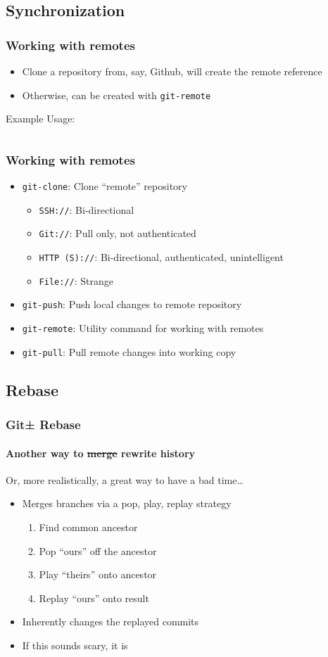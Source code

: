 \documentclass[]{beamer}
\begin{document}
\subsection{Synchronization}
\begin{frame}[fragile]
\frametitle{Working with remotes}
\begin{itemize}
\item{Clone a repository from, say, Github, will create the remote reference}
\item{Otherwise, can be created with \texttt{git-remote}}
\end{itemize}
Example Usage:
\inputminted{bash}{code/5/8}
\end{frame}

\begin{frame}
\frametitle{Working with remotes}
\begin{itemize}
\item{\texttt{git-clone}: Clone ``remote'' repository}
\begin{itemize}
\item{\texttt{SSH://}: Bi-directional}
\item{\texttt{Git://}: Pull only, not authenticated}
\item{\texttt{HTTP (S)://}: Bi-directional, authenticated, unintelligent}
\item{\texttt{File://}: Strange}
\end{itemize}
\item{\texttt{git-push}: Push local changes to remote repository}
\item{\texttt{git-remote}: Utility command for working with remotes}
\item{\texttt{git-pull}: Pull remote changes into working copy}
\end{itemize}
\end{frame}

\subsection{Rebase}
\begin{frame}
\frametitle{Git± Rebase}
\framesubtitle{Another way to \sout{merge} rewrite history}
Or, more realistically, a great way to have a bad time\ldots{}
\begin{itemize}
\item{Merges branches via a pop, play, replay strategy}
\begin{enumerate}
\item{Find common ancestor}
\item{Pop ``ours'' off the ancestor}
\item{Play ``theirs'' onto ancestor}
\item{Replay ``ours'' onto result}
\end{enumerate}
\item{Inherently changes the replayed commits}
\item{If this sounds scary, it is}
\end{itemize}
\end{frame}
\end{document}
